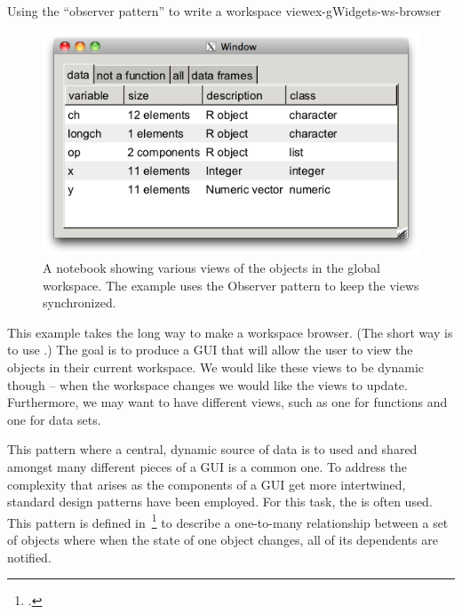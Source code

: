\begin{example}{Using the ``observer pattern'' to write a workspace view}{ex-gWidgets-ws-browser}


\begin{figure}
  \centering
  \includegraphics[width=.6\textwidth]{fig-gWidgets-ws-browser.png}
  \caption{A notebook showing various views of the objects in the global workspace. The example uses the Observer pattern to keep the views synchronized.}
  \label{fig:gWidgets-ws-browser}
\end{figure}


This example takes the long way to make a workspace browser. (The
short way is to use .) The goal is to produce
a GUI that will allow the user to view the objects in their current
workspace. We would like these views to be dynamic though -- when the
workspace changes we would like the views to update. Furthermore, we
may want to have different views, such as one for functions and one
for data sets.

This pattern where a central, dynamic source of data is to used and
shared amongst many different pieces of a GUI is a common one. To
address the complexity that arises as the components of a GUI get more
intertwined, standard design patterns have been employed. For this
task, the  is often used. This pattern is
defined in~\footcite{head-first-design-patterns} to describe a
one-to-many relationship between a set of objects where when the state
of one object changes, all of its dependents are notified.





\end{example}
